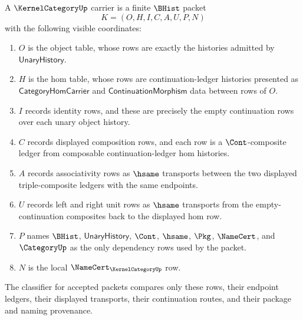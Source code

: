 \begin{definition}
\label{def:kernel-category-carrier}
A $\KernelCategoryUp$ carrier is a finite $\BHist$ packet
$$
K=(O,H,I,C,A,U,P,N)
$$
with the following visible coordinates:
\begin{enumerate}
\item $O$ is the object table, whose rows are exactly the histories admitted by $\mathsf{UnaryHistory}$.
\item $H$ is the hom table, whose rows are continuation-ledger histories presented as $\mathsf{CategoryHomCarrier}$ and $\mathsf{ContinuationMorphism}$ data between rows of $O$.
\item $I$ records identity rows, and these are precisely the empty continuation rows over each unary object history.
\item $C$ records displayed composition rows, and each row is a $\Cont$-composite ledger from composable continuation-ledger hom histories.
\item $A$ records associativity rows as $\hsame$ transports between the two displayed triple-composite ledgers with the same endpoints.
\item $U$ records left and right unit rows as $\hsame$ transports from the empty-continuation composites back to the displayed hom row.
\item $P$ names $\BHist$, $\mathsf{UnaryHistory}$, $\Cont$, $\hsame$, $\Pkg$, $\NameCert$, and $\CategoryUp$ as the only dependency rows used by the packet.
\item $N$ is the local $\NameCert_{\KernelCategoryUp}$ row.
\end{enumerate}
The classifier for accepted packets compares only these rows, their endpoint ledgers, their displayed transports, their continuation routes, and their package and naming provenance.
\end{definition}

